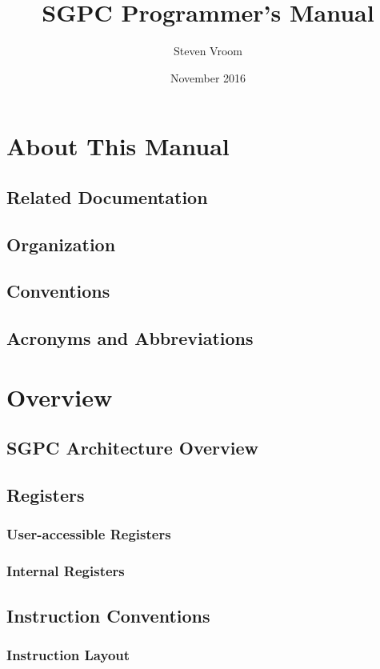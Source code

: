 \documentclass[oneside, a4paper]{memoir}
\begin{document}
\title{SGPC Programmer's Manual}
\author{Steven Vroom}
\date{November 2016}
\maketitle
\cleardoublepage

\frontmatter
\setcounter{tocdepth}{2}
\tableofcontents
\cleardoublepage

\chapter{About This Manual}
\section{Related Documentation}
\section{Organization}
\section{Conventions}
\section{Acronyms and Abbreviations}

\mainmatter
\chapter{Overview}
\section{SGPC Architecture Overview}
\section{Registers}
\subsection{User-accessible Registers}
\subsection{Internal Registers}
\section{Instruction Conventions}
\subsection{Instruction Layout}
\end{document}
